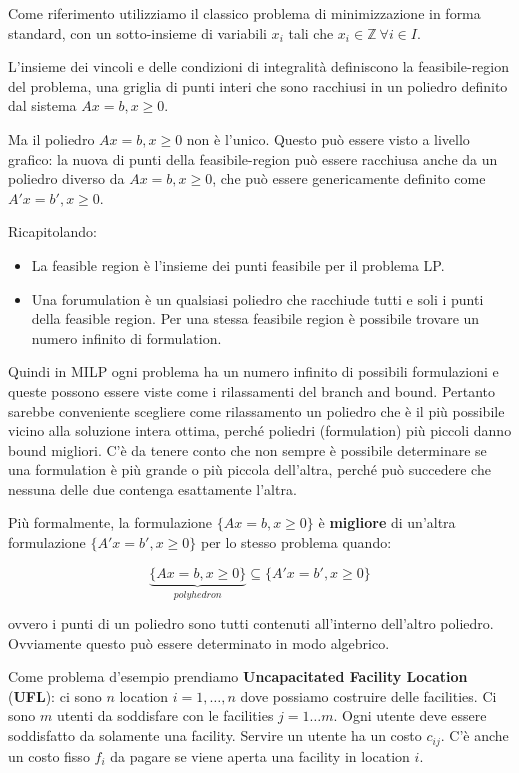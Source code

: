 Come riferimento utilizziamo il classico problema di minimizzazione in forma standard, con un sotto-insieme di variabili $x_i$ tali che $x_i \in \mathbb{Z}\: \forall i \in I$.

L'insieme dei vincoli e delle condizioni di integralità definiscono la feasibile-region del problema, una griglia di punti interi che sono racchiusi in un poliedro definito dal sistema $Ax = b, x \geq 0$.

Ma il poliedro $Ax=b, x \geq 0$ non è l'unico. Questo può essere visto a livello grafico: la nuova di punti della feasibile-region può essere racchiusa anche da un poliedro diverso da $Ax = b, x\geq 0$, che può essere genericamente definito come $A'x = b', x\geq0$.

Ricapitolando:
\begin{itemize}
	\item La feasible region è l'insieme dei punti feasibile per il problema LP.
	\item Una forumulation è un qualsiasi poliedro che racchiude tutti e soli i punti della feasible region. Per una stessa feasibile region è possibile trovare un numero infinito di formulation.
\end{itemize}  

Quindi in MILP ogni problema ha un numero infinito di possibili formulazioni e queste possono essere viste come i rilassamenti del branch and bound.
Pertanto sarebbe conveniente scegliere come rilassamento un poliedro che è il più possibile vicino alla soluzione intera ottima, perché poliedri (formulation) più piccoli danno bound migliori.
C'è da tenere conto che non sempre è possibile determinare se una formulation è più grande o più piccola dell'altra, perché può succedere che nessuna delle due contenga esattamente l'altra.

Più formalmente, la formulazione $\{Ax = b, x\geq0\}$ è \textbf{migliore} di un'altra formulazione $\{A'x = b', x\geq0\}$ per lo stesso problema quando:

$$
\underbrace{\{Ax = b, x\geq0\}}_{polyhedron} \subseteq \{A'x = b', x\geq0\}
$$

ovvero i punti di un poliedro sono tutti contenuti all'interno dell'altro poliedro. Ovviamente questo può essere determinato in modo algebrico.

Come problema d'esempio prendiamo \textbf{Uncapacitated Facility Location} (\textbf{UFL}): ci sono $n$ location $i = 1, \ldots, n$ dove possiamo costruire delle facilities. Ci sono $m$ utenti da soddisfare con le facilities $j = 1 \ldots m$. Ogni utente deve essere soddisfatto da solamente una facility. Servire un utente ha un costo $c_{ij}$. C'è anche un costo fisso $f_i$ da pagare se viene aperta una facility in location $i$.

